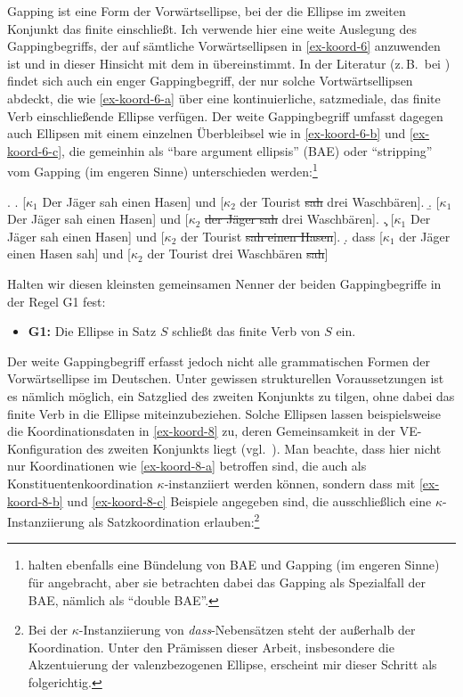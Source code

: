 Gapping ist eine Form der Vorwärtsellipse, bei der die Ellipse im zweiten Konjunkt das finite  einschlie\ss t. Ich verwende hier eine weite Auslegung des Gappingbegriffs, der auf sämtliche Vorwärtsellipsen in \ref{ex-koord-6} anzuwenden ist und in dieser Hinsicht mit dem in \citet[144]{Hartmann:00} übereinstimmt.  In der Literatur (z.\,B.\  bei \citealt{Ross:70,Jackendoff:71}) findet sich auch ein enger Gappingbegriff, der nur solche Vortwärtsellipsen abdeckt, die wie \ref{ex-koord-6-a} über eine kontinuierliche, satzmediale, das finite Verb einschlie\ss ende Ellipse verfügen. Der weite Gappingbegriff umfasst dagegen auch Ellipsen mit einem einzelnen Überbleibsel wie in \ref{ex-koord-6-b} und \ref{ex-koord-6-c}, die gemeinhin als "`bare argument ellipsis"' (BAE) oder "`stripping"' vom Gapping (im engeren Sinne) unterschieden werden:\footnote{\citet[275f]{Culicover:Jackendoff:05} halten ebenfalls eine Bündelung von BAE und Gapping (im engeren Sinne) für angebracht, aber sie betrachten dabei das Gapping als Spezialfall der BAE, nämlich als "`double BAE"'.}  

\ex. \label{ex-koord-6}
\a. \label{ex-koord-6-a}[$\kappa_1$ Der Jäger sah einen Hasen] und [$\kappa_2$ der Tourist \sout{sah} drei Waschbären].
\b. \label{ex-koord-6-b}[$\kappa_1$ Der Jäger sah einen Hasen] und [$\kappa_2$ \sout{der Jäger sah} drei Waschbären].
\c. \label{ex-koord-6-c}[$\kappa_1$ Der Jäger sah einen Hasen] und [$\kappa_2$ der Tourist \sout{sah einen Hasen}].
\d. \label{ex-koord-6-c} dass [$\kappa_1$ der Jäger einen Hasen sah] und [$\kappa_2$ der Tourist drei Waschbären \sout{sah}]

Halten wir diesen kleinsten gemeinsamen Nenner der beiden Gappingbegriffe in der Regel G1 fest:
\begin{itemize}
  \item[] {\bf G1:} Die Ellipse in Satz $S$ schlie\ss t das finite Verb von $S$ ein.
\end{itemize}
Der weite Gappingbegriff erfasst jedoch nicht alle grammatischen Formen der Vorwärtsellipse im Deutschen. Unter gewissen strukturellen Voraussetzungen ist es nämlich möglich, ein Satzglied des zweiten Konjunkts zu tilgen, ohne dabei das finite Verb in die Ellipse miteinzubeziehen. Solche Ellipsen lassen beispielsweise die Koordinationsdaten in \ref{ex-koord-8} zu, deren Gemeinsamkeit in der VE-Konfiguration des zweiten Konjunkts liegt (vgl.\ \citealt{Wilder:94,Wilder:97}). Man beachte, dass hier nicht nur Koordinationen wie \ref{ex-koord-8-a} betroffen sind, die auch als Konstituentenkoordination $\kappa$-instanziiert werden können, sondern dass mit \ref{ex-koord-8-b} und \ref{ex-koord-8-c} Beispiele angegeben sind, die ausschlie\ss lich eine $\kappa$-Instanziierung als Satzkoordination erlauben:\footnote{Bei der $\kappa$-Instanziierung von \emph{dass}-Nebensätzen steht der  au\ss erhalb der Koordination. Unter den Prämissen dieser Arbeit, insbesondere die Akzentuierung der valenzbezogenen Ellipse, erscheint mir dieser Schritt als folgerichtig.} 

